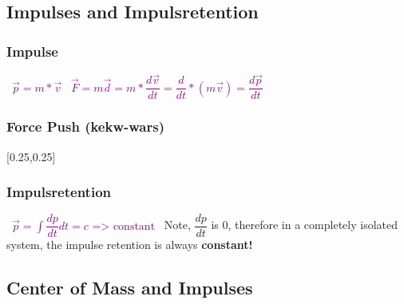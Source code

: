 \documentclass[main.tex,fontsize=8pt,paper=a4,paper=portrait,DIV=calc,]{scrartcl}
\begin{document}
\begin{multicols*}{2}
\subsection{Impulses and Impulsretention}
\subsubsection{Impulse}
\, \newline
\large \textcolor{purple}{\( \vec{p} = m * \vec{v} \)}\newline
\, \newline
\textcolor{purple}{\( \vec{F} = m\vec{d} = m * \dfrac{d\vec{v}}{dt} = \dfrac{d}{dt} * (m\vec{v}) = \dfrac{d\vec{p}}{dt} \)}\newline
\normalsize \, \newline

\subsubsection{Force Push (kekw-wars)}
[0.25,0.25]

\subsubsection{Impulsretention}
\, \newline
\large \textcolor{purple}{ \( \vec{p} = \int \dfrac{dp}{dt} dt = c \text{ => constant}\)}\newline
\Large \, \newline
Note, \(\dfrac{dp}{dt}\) is 0, therefore in a completely isolated system, the impulse retention is always \textbf{constant!} \normalsize \newline


\subsection{Center of Mass and Impulses} 

\end{multicols*}
\end{document}

